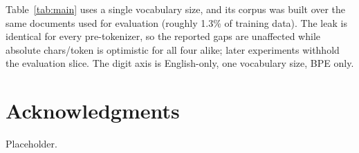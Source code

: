 \documentclass[11pt]{article}
\begin{document}
Table~\ref{tab:main} uses a single vocabulary size, and its corpus was built over the same
documents used for evaluation (roughly 1.3\% of training data). The leak is identical for
every pre-tokenizer, so the reported gaps are unaffected while absolute chars/token is
optimistic for all four alike; later experiments withhold the evaluation slice. The digit
axis is English-only, one vocabulary size, BPE only.

\section*{Acknowledgments}

Placeholder.


\end{document}
